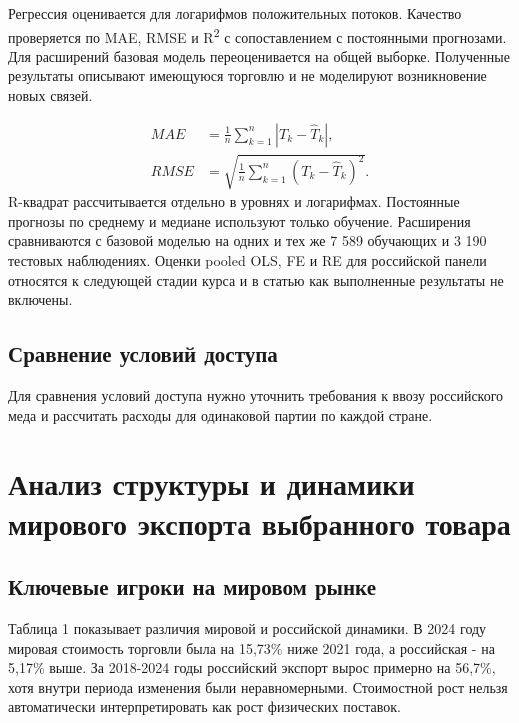 \documentclass[12pt,a4paper]{article}
\begin{document}
Регрессия оценивается для логарифмов положительных потоков. Качество проверяется по MAE, RMSE и R\textsuperscript{2} с сопоставлением с постоянными прогнозами. Для расширений базовая модель переоценивается на общей выборке. Полученные результаты описывают имеющуюся торговлю и не моделируют возникновение новых связей.

\begin{align}
MAE&=\frac{1}{n}\sum_{k=1}^{n}|T_k-\widehat T_k|,\\
RMSE&=\sqrt{\frac{1}{n}\sum_{k=1}^{n}(T_k-\widehat T_k)^2}.
\end{align}
R-квадрат рассчитывается отдельно в уровнях и логарифмах. Постоянные прогнозы по среднему и медиане используют только обучение. Расширения сравниваются с базовой моделью на одних и тех же 7 589 обучающих и 3 190 тестовых наблюдениях. Оценки pooled OLS, FE и RE для российской панели относятся к следующей стадии курса и в статью как выполненные результаты не включены.

\subsection{Сравнение условий доступа}
Для сравнения условий доступа нужно уточнить требования к ввозу российского меда и рассчитать расходы для одинаковой партии по каждой стране.

\section{Анализ структуры и динамики мирового экспорта выбранного товара}
\subsection{Ключевые игроки на мировом рынке}
Таблица 1 показывает различия мировой и российской динамики. В 2024 году мировая стоимость торговли была на 15,73\% ниже 2021 года, а российская - на 5,17\% выше. За 2018-2024 годы российский экспорт вырос примерно на 56,7\%, хотя внутри периода изменения были неравномерными. Стоимостной рост нельзя автоматически интерпретировать как рост физических поставок.
\end{document}
